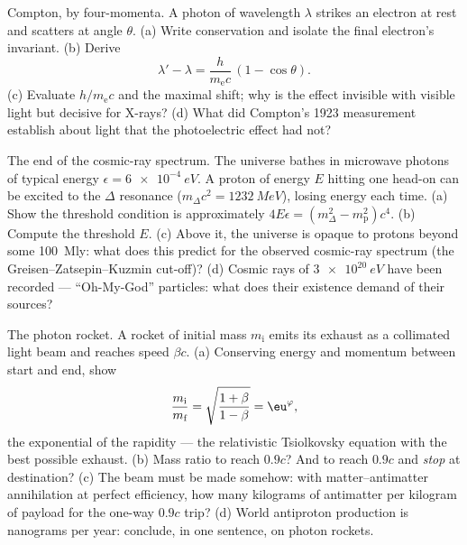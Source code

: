 \begin{exercise}[$\star\star\star$]\label{exo:b3:relativistic-dynamics:10}
Compton, by four-momenta. A photon of wavelength $\lambda$ strikes an
electron at rest and scatters at angle $\theta$. (a) Write
 conservation and isolate the final electron's
invariant. (b) Derive
\[
\lambda' - \lambda = \frac{h}{m_{\text{e}}c}\,(1 - \cos\theta) .
\]
(c) Evaluate $h/m_{\text{e}}c$ and the maximal shift; why is the
effect invisible with visible light but decisive for X-rays? (d)
What did Compton's 1923 measurement establish about light that the
photoelectric effect had not?
\end{exercise}

\begin{exercise}[$\star\star\star$]\label{exo:b3:relativistic-dynamics:11}
The end of the cosmic-ray spectrum. The universe bathes in microwave
photons of typical energy $\epsilon = \qty{6e-4}{eV}$. A proton of
energy $E$ hitting one head-on can be excited to the $\Delta$
resonance ($m_\Delta c^2 = \qty{1232}{MeV}$), losing energy each
time. (a) Show the threshold condition is approximately $4E\epsilon =
(m_\Delta^2 - m_{\text{p}}^2)c^4$. (b) Compute the threshold $E$.
(c) Above it, the universe is opaque to protons beyond some
\qty{100}{Mly}: what does this predict for the observed cosmic-ray
spectrum (the Greisen--Zatsepin--Kuzmin cut-off)? (d) Cosmic rays of
$\qty{3e20}{eV}$ have been recorded --- ``Oh-My-God'' particles: what
does their existence demand of their sources?
\end{exercise}

\begin{exercise}[$\star\star\star$]\label{exo:b3:relativistic-dynamics:12}
The photon rocket. A rocket of initial mass $m_{\text{i}}$ emits its
exhaust as a collimated light beam and reaches speed $\beta c$. (a)
Conserving energy and momentum between start and end, show
\[
\frac{m_{\text{i}}}{m_{\text{f}}} =
\sqrt{\frac{1 + \beta}{1 - \beta}} = \eu^{\varphi} ,
\]
the exponential of the rapidity --- the relativistic Tsiolkovsky
equation with the best possible exhaust. (b) Mass ratio to reach
$0.9c$? And to reach $0.9c$ and \emph{stop} at destination? (c) The
beam must be made somehow: with matter--antimatter annihilation at
perfect efficiency, how many kilograms of antimatter per kilogram of
payload for the one-way $0.9c$ trip? (d) World antiproton production
is nanograms per year: conclude, in one sentence, on photon rockets.
\end{exercise}

